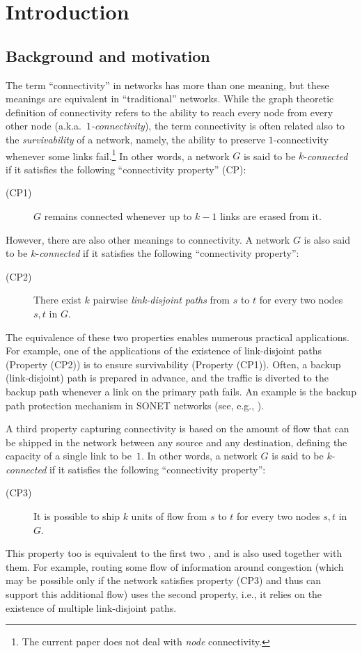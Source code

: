 \LongVersion \documentclass[11pt]{article}
\theoremstyle{definition}
\theoremstyle{plain}
\begin{document}
\section{Introduction}
\subsection{Background and motivation}


The term ``connectivity'' in networks has more than one meaning,
but these meanings are equivalent in ``traditional'' networks.
While the graph theoretic definition of connectivity refers to the ability to
reach every node from every other node (a.k.a.\ \emph{$1$-connectivity}), the
term connectivity is often related also to the \emph{survivability} of a
network, namely, the ability to preserve $1$-connectivity whenever some links
fail.\footnote{
The current paper does not deal with {\em node} connectivity.
}
In other words, a network $G$ is said to be $k$-{\em connected} if it
satisfies the following ``connectivity property'' (CP):
\begin{description}
\item[(CP1)] $G$ remains connected whenever up to $k-1$ links are erased from
it.
\end{description}

However, there are also other meanings to connectivity.
A network $G$ is also said to be $k$-{\em connected} if it
satisfies the following  ``connectivity property'':
\begin{description}
\item[(CP2)] There exist $k$ pairwise {\em link-disjoint paths} from $s$ to
$t$ for every two nodes $s, t$ in $G$.
\end{description}
The equivalence of these two properties \cite{Meng27} enables numerous
practical applications.
For example, one of the applications of the existence of link-disjoint paths
(Property (CP2)) is to ensure survivability (Property (CP1)).
Often, a backup (link-disjoint) path is prepared in advance, and the traffic
is diverted to the backup path whenever a link on the primary path fails.
An example is the backup path protection mechanism in SONET networks (see,
e.g., \cite{protection}).

A third property capturing connectivity is based on the amount of flow that
can be shipped in the network between any source and any destination, defining
the capacity of a single link to be~$1$.
In other words, a network $G$ is said to be $k$-{\em connected} if it
satisfies the following  ``connectivity property'':
\begin{description}
\item[(CP3)] It is possible to ship $k$ units of flow from $s$ to $t$ for
every two nodes $s, t$ in $G$.
\end{description}
This property too is equivalent to the first two \cite{FF56}, and is also used
together with them.
For example, routing some flow of information around congestion (which may be
possible only if the network satisfies property (CP3) and thus can support
this additional flow) uses the second property, i.e., it relies on the
existence of multiple link-disjoint paths.
\end{document}
